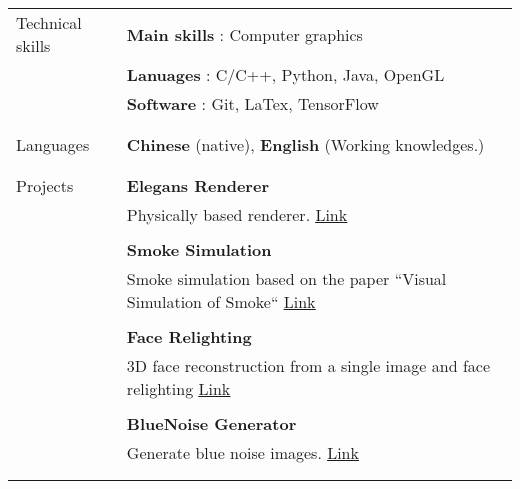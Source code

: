 \documentclass[letterpaper,11pt,oneside]{article}
\begin{document}
\begin{tabular}{@{} l l}
	  
\Large{Technical skills} & \textbf{Main skills \hspace{0.2em}}:  Computer graphics  \\
	& \textbf{Lanuages   \hspace{0.7em} }:  C/C++, Python, Java, OpenGL \\
	& \textbf{Software  \hspace{1em} }:  Git, LaTex, TensorFlow \\
	& \\  
	& \\  

\Large{Languages}   & \textbf{Chinese} (native), \textbf{English} (Working knowledges.) \\
  & \\
  & \\
   
\Large{Projects}   
   & \textbf{Elegans Renderer}\\
   & \parbox{5.0in}{Physically based renderer. \hfill \href{https://github.com/gao-duan/Elegans}{\underline{Link}}} \\
   & \\
   & \textbf{Smoke Simulation}\\
   & \parbox{5.0in}{Smoke simulation based on the paper ``Visual Simulation of Smoke`` \hfill \href{https://github.com/gao-duan/SmokeSimulation}{\underline{Link}}} \\
   & \\
   & \textbf{Face Relighting}\\
   & \parbox{5.0in}{3D face reconstruction from a single image and face relighting \hfill \href{https://github.com/gao-duan/FaceRelighting}{\underline{Link}}} \\
   & \\
   & \textbf{BlueNoise Generator}\\
   & \parbox{5.0in}{Generate blue noise images. \hfill \href{https://github.com/gao-duan/BlueNoise}{\underline{Link}}} \\
   & \\
   & \\
    


\end{tabular}    
\end{document}
